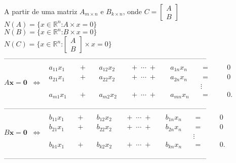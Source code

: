 \documentclass[leqno]{article}
\numberwithin{equation}{section}
\begin{document}
\begin{enumerate}
		\begin{sol} 
			\newline
			A partir de uma matriz $A_{m \times n}$ e $B_{k \times n}$, onde $C = \begin{bmatrix}A \\ B \end{bmatrix}$\\
			$N(A) = \{x \in \mathbb{R}^n \mbox{:} A \times x = 0\}$\\
			$N(B) = \{x \in \mathbb{R}^n \mbox{:} B \times x = 0\}$\\
			$N(C) = \{x \in \mathbb{R}^n \mbox{:} \begin{bmatrix} A \\ B \end{bmatrix}
			\times x = 0\}$   \\
			\newline
			--------------------------------------------------------------------------------------\\
			${\displaystyle A\mathbf {x} =\mathbf {0} \;\;\Leftrightarrow \;\;{\begin{alignedat}{7}a_{11}x_{1}&&\;+\;&&a_{12}x_{2}&&\;+\;\cdots \;+\;&&a_{1n}x_{n}&&\;=\;&&&0\\a_{21}x_{1}&&\;+\;&&a_{22}x_{2}&&\;+\;\cdots \;+\;&&a_{2n}x_{n}&&\;=\;&&&0\\&&&&&&&&&&\vdots \ \;&&&\\a_{m1}x_{1}&&\;+\;&&a_{m2}x_{2}&&\;+\;\cdots \;+\;&&a_{mn}x_{n}&&\;=\;&&&0{\text{.}}\\\end{alignedat}}}$\\
			--------------------------------------------------------------------------------------\\
			${\displaystyle B\mathbf {x} =\mathbf {0} \;\;\Leftrightarrow \;\;{\begin{alignedat}{7}b_{11}x_{1}&&\;+\;&&b_{12}x_{2}&&\;+\;\cdots \;+\;&&b_{1n}x_{n}&&\;=\;&&&0\\b_{21}x_{1}&&\;+\;&&b_{22}x_{2}&&\;+\;\cdots \;+\;&&b_{2n}x_{n}&&\;=\;&&&0\\&&&&&&&&&&\vdots \ \;&&&\\b_{k1}x_{1}&&\;+\;&&b_{k2}x_{2}&&\;+\;\cdots \;+\;&&b_{kn}x_{n}&&\;=\;&&&0{\text{.}}\\\end{alignedat}}}$\\
			--------------------------------------------------------------------------------------\\

\end{sol}
\end{enumerate}
\end{document}
